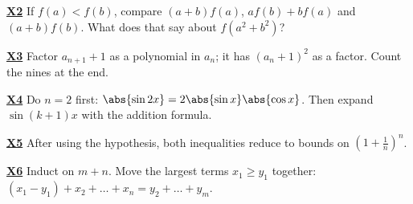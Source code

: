 \documentclass[10pt]{scrartcl}
\begin{document}
\par\medskip\noindent\textbf{\hyperlink{prob-X2}{X2}} If $f(a) < f(b)$, compare $(a+b)f(a)$, $af(b) + bf(a)$ and $(a+b)f(b)$. What does that say about $f(a^2+b^2)$?

\par\medskip\noindent\textbf{\hyperlink{prob-X3}{X3}} Factor $a_{n+1} + 1$ as a polynomial in $a_n$; it has $(a_n + 1)^2$ as a factor. Count the nines at the end.

\par\medskip\noindent\textbf{\hyperlink{prob-X4}{X4}} Do $n = 2$ first: $\abs{\sin 2x} = 2\abs{\sin x}\abs{\cos x}$. Then expand $\sin(k+1)x$ with the addition formula.

\par\medskip\noindent\textbf{\hyperlink{prob-X5}{X5}} After using the hypothesis, both inequalities reduce to bounds on $\left(1 + \frac1n\right)^n$.

\par\medskip\noindent\textbf{\hyperlink{prob-X6}{X6}} Induct on $m + n$. Move the largest terms $x_1 \geq y_1$ together: $(x_1 - y_1) + x_2 + \dots + x_n = y_2 + \dots + y_m$.
\end{document}
